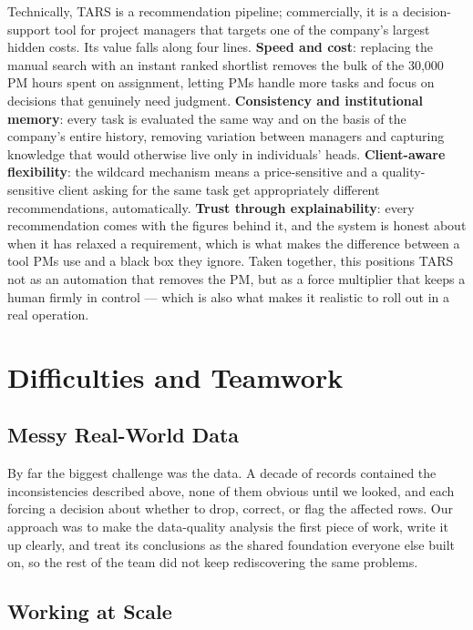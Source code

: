 \documentclass[9pt,a4paper,twoside]{utils/tau-class/tau}
\begin{document}
Technically, TARS is a recommendation pipeline; commercially, it is a decision-support tool for project managers that targets one of the company's largest hidden costs. Its value falls along four lines. \textbf{Speed and cost}: replacing the manual search with an instant ranked shortlist removes the bulk of the 30,000 PM hours spent on assignment, letting PMs handle more tasks and focus on decisions that genuinely need judgment. \textbf{Consistency and institutional memory}: every task is evaluated the same way and on the basis of the company's entire history, removing variation between managers and capturing knowledge that would otherwise live only in individuals' heads. \textbf{Client-aware flexibility}: the wildcard mechanism means a price-sensitive and a quality-sensitive client asking for the same task get appropriately different recommendations, automatically. \textbf{Trust through explainability}: every recommendation comes with the figures behind it, and the system is honest about when it has relaxed a requirement, which is what makes the difference between a tool PMs use and a black box they ignore. Taken together, this positions TARS not as an automation that removes the PM, but as a force multiplier that keeps a human firmly in control --- which is also what makes it realistic to roll out in a real operation.

\section{Difficulties and Teamwork}

\subsection{Messy Real-World Data}

By far the biggest challenge was the data. A decade of records contained the inconsistencies described above, none of them obvious until we looked, and each forcing a decision about whether to drop, correct, or flag the affected rows. Our approach was to make the data-quality analysis the first piece of work, write it up clearly, and treat its conclusions as the shared foundation everyone else built on, so the rest of the team did not keep rediscovering the same problems.

\subsection{Working at Scale}
\end{document}

